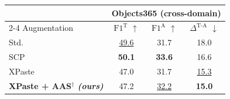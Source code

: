 \begin{tabular}{l ccc}
\toprule
& \multicolumn{3}{c}{\textbf{Objects365 (cross-domain)}} \\
\cmidrule(lr){2-4}
Augmentation & $\text{F1}^{\text{T}}$ $\uparrow$ & $\text{F1}^{\text{A}}$ $\uparrow$ & $\Delta^{\text{T-A}}$ $\downarrow$ \\
\midrule
Std. & \underline{49.6} & 31.7 & 18.0 \\
SCP & \textbf{50.1} & \textbf{33.6} & 16.6 \\
\midrule
XPaste & 47.0 & 31.7 & \underline{15.3} \\
\midrule
\rowcolor{oursrow} \textbf{XPaste + AAS$^{\dagger}$ \emph{(ours)}} & 47.2 & \underline{32.2} & \textbf{15.0} \\
\bottomrule
\end{tabular}
